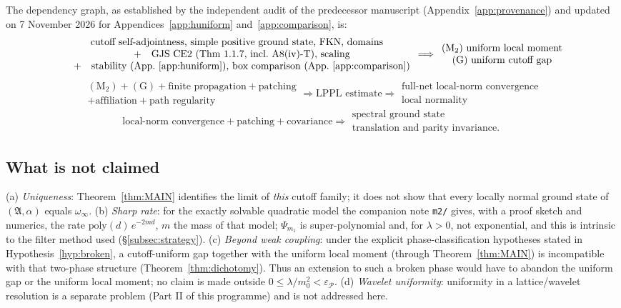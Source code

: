 \documentclass[11pt,a4paper]{article}
\theoremstyle{plain}
\theoremstyle{definition}
\theoremstyle{plain}
\theoremstyle{definition}
\newcommand{\A}{\mathfrak{A}}
\begin{document}
The dependency graph, as established by the independent audit of the predecessor
manuscript (Appendix~\ref{app:provenance}) and updated on 7 November 2026 for
Appendices~\ref{app:huniform} and~\ref{app:comparison}, is:
\begingroup\footnotesize
\[
\begin{array}{c}
\text{cutoff self-adjointness, simple positive ground state, FKN, domains}\\
\quad+\quad\text{GJS CE2 (Thm 1.1.7, incl.\ A8(iv)-T), scaling}\\
\quad+\quad\text{stability (App.~\ref{app:huniform}), box comparison (App.~\ref{app:comparison})}
\end{array}
\Longrightarrow
\begin{array}{c}
(\mathrm M_2)\ \text{uniform local moment}\\
(\mathrm G)\ \text{uniform cutoff gap}
\end{array}
\]
\[
\begin{array}{c}
(\mathrm M_2)+(\mathrm G)+\text{finite propagation}+\text{patching}\\
+\text{affiliation}+\text{path regularity}
\end{array}
\Longrightarrow
\text{LPPL estimate}
\Longrightarrow
\begin{array}{c}
\text{full-net local-norm convergence}\\
\text{local normality}
\end{array}
\]
\[
\text{local-norm convergence}+\text{patching}+\text{covariance}
\Longrightarrow
\begin{array}{c}
\text{spectral ground state}\\
\text{translation and parity invariance.}
\end{array}
\]
\endgroup

\subsection{What is not claimed}

(a) \emph{Uniqueness}: Theorem~\ref{thm:MAIN} identifies the limit of \emph{this} cutoff family;
it does not show that every locally normal ground state of $(\A,\alpha)$ equals $\omega_\infty$.
(b) \emph{Sharp rate}: for the exactly solvable quadratic model the companion note \texttt{m2/}
gives, with a proof sketch and numerics, the rate $\mathrm{poly}(d)\,e^{-2md}$, $m$ the mass of
that model; $\Psi_{m_1}$ is super-polynomial and, for $\lambda>0$, not exponential, and this is
intrinsic to the filter method used (\S\ref{subsec:strategy}). (c) \emph{Beyond weak coupling}:
under the explicit phase-classification hypotheses stated in Hypothesis~\ref{hyp:broken}, a
cutoff-uniform gap together with the uniform local moment (through Theorem~\ref{thm:MAIN}) is
incompatible with that two-phase structure (Theorem~\ref{thm:dichotomy}). Thus an extension to
such a broken phase would have to abandon the uniform gap or the uniform local moment; no claim
is made outside $0\le\lambda/m_0^2<\varepsilon_{\mathscr P}$.
(d) \emph{Wavelet uniformity}: uniformity in a lattice/wavelet resolution is a separate
problem (Part II of this programme) and is not addressed here.
\end{document}
